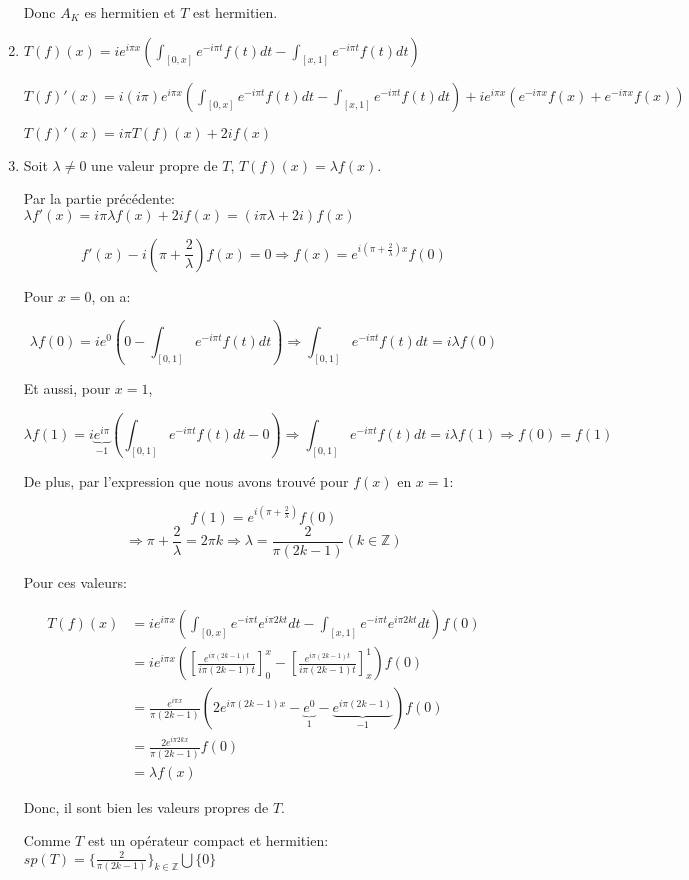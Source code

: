 \documentclass[10pt,a4paper,oneside]{article}
\newenvironment{solution}[1][Solution]{\begin{trivlist}
\item[\hskip \labelsep {\bfseries #1}]}{\end{trivlist}}
\begin{document}
\begin{solution}
\begin{enumerate}
Donc $A_K$ es hermitien et $T$ est hermitien.

\item
$T(f)(x) = ie^{i \pi x}(\int_{[0,x]}e^{-i \pi t} f(t) dt - \int_{[x,1]}e^{-i \pi t} f(t) dt)$

$T(f)'(x) = i(i \pi) e^{i \pi x} (\int_{[0,x]}e^{-i \pi t} f(t) dt - \int_{[x,1]}e^{-i \pi t} f(t) dt) + i e^{i \pi x} (e^{-i \pi x}f(x) + e^{-i \pi x}f(x))$

$\boxed{T(f)'(x) = i \pi T(f)(x) + 2i f(x)}$

\item
Soit $\lambda \neq 0$ une valeur propre de $T$, $T(f)(x) = \lambda f(x)$.

Par la partie précédente: $\lambda f'(x) = i \pi \lambda f(x) + 2i f(x) = (i \pi \lambda + 2i)f(x)$

\[ f'(x) - i (\pi + \frac{2}{\lambda}) f(x) = 0 \Rightarrow f(x) = e^{i(\pi + \frac{2}{\lambda})x} f(0) \]

Pour $x = 0$, on a:

\[ \lambda f(0) = i e^0 (0 - \int_{[0,1]}e^{-i \pi t} f(t)dt) \Rightarrow \int_{[0,1]}e^{-i \pi t} f(t)dt = i \lambda f(0) \]

Et aussi, pour $x = 1$, 

\[ \lambda f(1) = i \underbrace{e^{i \pi}}_{-1} (\int_{[0,1]}e^{-i \pi t} f(t)dt - 0) \Rightarrow \int_{[0,1]}e^{-i \pi t} f(t)dt = i \lambda f(1) \Rightarrow f(0) = f(1) \]

De plus, par l'expression que nous avons trouvé pour $f(x)$ en $x = 1$:

\[ f(1) = e^{i(\pi + \frac{2}{\lambda})} f(0) \]
\[ \Rightarrow \pi + \frac{2}{\lambda} = 2 \pi k \Rightarrow \lambda = \frac{2}{\pi(2k - 1)}(k \in \mathbb{Z}) \]

Pour ces valeurs:

\begin{align}
T(f)(x) &= ie^{i \pi x}(\int_{[0,x]} e^{-i \pi t} e^{i \pi 2kt} dt - \int_{[x,1]} e^{-i \pi t} e^{i \pi 2kt} dt) f(0) \nonumber \\
&= ie^{i \pi x}([\frac{e^{i \pi (2k - 1) t}}{i \pi (2k - 1) t}]^x_0 - [\frac{e^{i \pi (2k - 1) t}}{i \pi (2k - 1) t}]^1_x) f(0) \nonumber \\
&= \frac{e^{i \pi x}}{\pi (2k - 1)}(2e^{i \pi (2k - 1) x} - \underbrace{e^0}_{1} - \underbrace{e^{i \pi (2k - 1)}}_{-1}) f(0) \nonumber \\
&= \frac{2e^{i \pi 2k x}}{\pi (2k - 1)} f(0) \nonumber \\
&= \lambda f(x) \nonumber
\end{align}

Donc, il sont bien les valeurs propres de $T$.

Comme $T$ est un opérateur compact et hermitien: $sp(T) = \{ \frac{2}{\pi (2k - 1)} \}_{k \in \mathbb{Z}} \bigcup \{ 0 \}$

\end{enumerate}
\end{solution}
\end{document}
